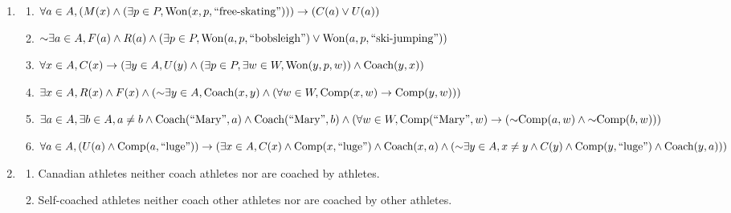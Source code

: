 \documentclass[11pt, notitlepage, leqno]{article}
\renewcommand{\neg}{\mathord{\sim}}
\begin{document}

\begin{enumerate}

\item \begin{enumerate}

\item $\forall a \in A, (M(x) \wedge (\exists p \in P, \textrm{\textrm{Won}}(x, p, \textrm{``free-skating''}))) \to (C(a) \vee U(a))$

\item $\neg \exists a \in A, F(a) \wedge R(a) \wedge (\exists p \in P, \textrm{\textrm{Won}}(a, p, \textrm{``bobsleigh''}) \vee \textrm{\textrm{Won}}(a, p, \textrm{``ski-jumping''}))$

\item $\forall x \in A, C(x) \to (\exists y \in A, U(y) \wedge (\exists p \in P, \exists w \in W, \textrm{\textrm{Won}}(y, p, w)) \wedge \textrm{Coach}(y, x))$

\item $\exists x \in A, R(x) \wedge F(x) \wedge (\neg \exists y \in A, \textrm{Coach}(x, y) \wedge (\forall w \in W, \textrm{\textrm{Comp}}(x,w) \to \textrm{\textrm{Comp}}(y,w)))$

\item $\exists a \in A, \exists b \in A, a \neq b \wedge \textrm{Coach}(\textrm{``Mary''}, a) \wedge \textrm{Coach}(\textrm{``Mary''}, b) \wedge\\
(\forall w \in W, \textrm{\textrm{Comp}}(\textrm{``Mary''}, w) \to (\neg \textrm{\textrm{Comp}}(a, w) \wedge \neg \textrm{\textrm{Comp}}(b, w)))$

\item $\forall a \in A, (U(a) \wedge \textrm{\textrm{Comp}}(a, \textrm{``luge''})) \to (\exists x \in A, C(x) \wedge \textrm{\textrm{Comp}}(x, \textrm{``luge''}) \wedge \textrm{Coach}(x, a) \wedge \\
(\neg \exists y \in A, x \neq y \wedge C(y) \wedge \textrm{\textrm{Comp}}(y, \textrm{``luge''}) \wedge \textrm{Coach}(y, a)))$

\end{enumerate}

\item \begin{enumerate}

\item Canadian athletes neither coach athletes nor are coached by athletes.

\item Self-coached athletes neither coach other athletes nor are coached by other athletes.


\end{enumerate}
\end{enumerate}
\end{document}
